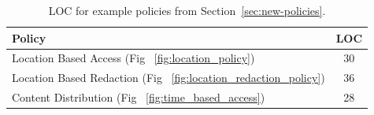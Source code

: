 




\begin{table}[h!]
\centering
{\small
\begin{tabular}{|l|c|}
\hline
\textbf{Policy}          & \textbf{LOC} \\ \hline\hline
Location Based Access (Fig  ~\ref{fig:location_policy}) & 30  \\ \hline
Location Based Redaction (Fig ~\ref{fig:location_redaction_policy})   & 36  \\ \hline
Content Distribution (Fig ~\ref{fig:time_based_access})    & 28  \\ \hline
\end{tabular}
}
\caption{LOC for example policies from Section~\ref{sec:new-policies}.}
\label{policy-loc}
\end{table}

